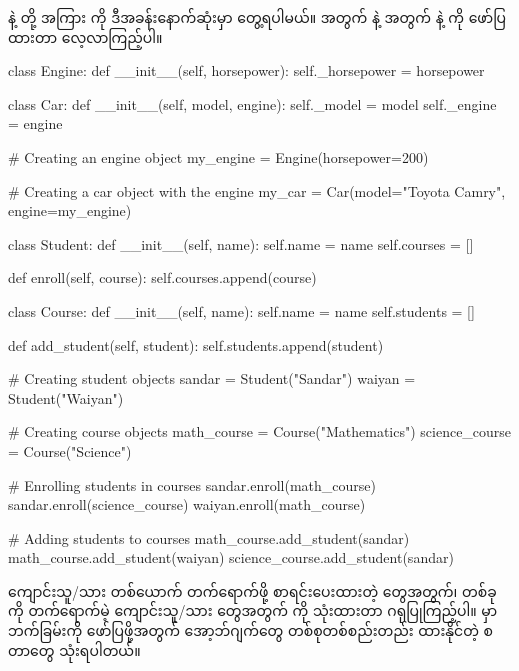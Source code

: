  နဲ့  တို့ အကြား  ကို ဒီအခန်းနောက်ဆုံးမှာ တွေ့ရပါမယ်။  အတွက်  နဲ့ \fEn{,}  အတွက်  နဲ့  ကို ဖော်ပြထားတာ လေ့လာကြည့်ပါ။ 

%
\begin{py}
class Engine:
    def __init__(self, horsepower):
        self._horsepower = horsepower


class Car:
    def __init__(self, model, engine):
        self._model = model
        self._engine = engine


# Creating an engine object
my_engine = Engine(horsepower=200)

# Creating a car object with the engine
my_car = Car(model="Toyota Camry", engine=my_engine)
\end{py}
%
\begin{py}
class Student:
    def __init__(self, name):
        self.name = name
        self.courses = []

    def enroll(self, course):
        self.courses.append(course)


class Course:
    def __init__(self, name):
        self.name = name
        self.students = []

    def add_student(self, student):
        self.students.append(student)


# Creating student objects
sandar = Student("Sandar")
waiyan = Student("Waiyan")

# Creating course objects
math_course = Course("Mathematics")
science_course = Course("Science")

# Enrolling students in courses
sandar.enroll(math_course)
sandar.enroll(science_course)
waiyan.enroll(math_course)

# Adding students to courses
math_course.add_student(sandar)
math_course.add_student(waiyan)
science_course.add_student(sandar)

\end{py}
%

ကျောင်းသူ/သား တစ်ယောက် တက်ရောက်ဖို့ စာရင်းပေးထားတဲ့  တွေအတွက်၊   တစ်ခုကို တက်ရောက်မဲ့ ကျောင်းသူ/သား တွေအတွက်  ကို သုံးထားတာ ဂရုပြုကြည့်ပါ။  မှာ  ဘက်ခြမ်းကို ဖော်ပြဖို့အတွက်  အော့ဘ်ဂျက်တွေ တစ်စုတစ်စည်းတည်း ထားနိုင်တဲ့  စတာတွေ သုံးရပါတယ်။


